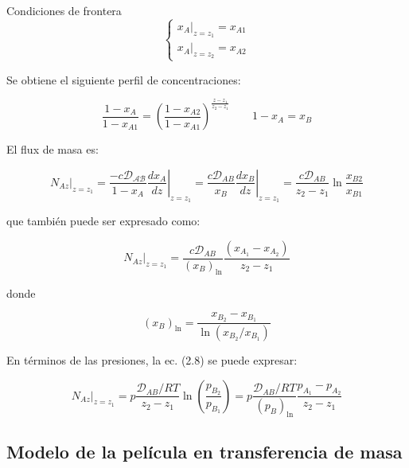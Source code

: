 Condiciones de frontera 
\begin{equation}
	\left\{
	\begin{aligned}
	x_A |_{z=z_1} = x_{A1} \\
	x_A |_{z=z_2} = x_{A2}
	\end{aligned}
	\right.
    \label{eq_2.5}
\end{equation}

Se obtiene el siguiente perfil de concentraciones:

\begin{equation}
	\frac{1-x_A}{1-x_{A1}} = \left( \frac{1-x_{A2}}{1-x_{A1}} \right)^{\frac{z-z_1}{z_2-z_1}} 
	\qquad 
	1-x_A = x_B
    \label{eq_2.6}
\end{equation}

El flux de masa es:

\begin{equation}
N_{Az} |_{z=z_1} = \left. \frac{ - c \mathcal{\mathscr{D}_{AB}}}{1-x_A} \frac{dx_A}{dz} \right|_{z=z_1} = \left. \frac{c \mathscr{D}_{AB}}{x_B} \frac{dx_B}{dz} \right|_{z=z_1} =  \frac{c \mathscr{D}_{AB}}{z_2 - z_1} \ln{\frac{x_{B2}}{x_{B1}}}
\label{eq_2.7}
\end{equation}

que también puede ser expresado como: 

\begin{equation}
	N_{Az}|_{z=z_1} = \frac{c \mathscr{D}_{AB}}{(x_B)_{\ln{}}} \frac{(x_{A_1} - x_{A_2})}{z_2 - z_1}
    \label{eq_2.8}
\end{equation}

donde 

\begin{equation}
(x_B)_{\ln{}} = \frac{x_{B_2} - x_{B_1}}{\ln{(x_{B_2}/x_{B_1})}}
\label{eq_2.9}
\end{equation}

En términos de las presiones, la ec. (2.8) se puede expresar: 

\begin{equation}
N_{Az}|_{z=z_1} = p \frac{\mathscr{D}_{AB}/RT}{z_2 - z_1} \ln{\left( \frac{p_{B_2}}{p_{B_1}}\right)} = p\frac{\mathscr{D}_{AB}/RT}{(p_B)_{\ln}} \frac{p_{A_1}-p_{A_2}}{z_2 - z_1}
\label{eq_2.10}
\end{equation}


\subsection{Modelo de la película en transferencia de masa}

